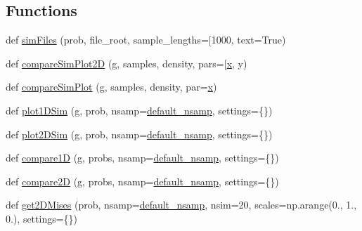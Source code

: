 \subsection*{Functions}
\begin{DoxyCompactItemize}
\item 
def \mbox{\hyperlink{namespacegetdist__tests_1_1test__distributions_a67a512c46fba1d2a8de61258145201a8}{sim\+Files}} (prob, file\+\_\+root, sample\+\_\+lengths=\mbox{[}1000, text=True)
\item 
def \mbox{\hyperlink{namespacegetdist__tests_1_1test__distributions_ae808a89af18399d4abd592da4c182444}{compare\+Sim\+Plot2D}} (g, samples, density, pars=\mbox{[}\textquotesingle{}\mbox{\hyperlink{plotTT_8m_a9336ebf25087d91c818ee6e9ec29f8c1}{x}}\textquotesingle{}, y)
\item 
def \mbox{\hyperlink{namespacegetdist__tests_1_1test__distributions_a52f500d4237fe1a9b8698c71102c025d}{compare\+Sim\+Plot}} (g, samples, density, par=\textquotesingle{}\mbox{\hyperlink{plotTT_8m_a9336ebf25087d91c818ee6e9ec29f8c1}{x}}\textquotesingle{})
\item 
def \mbox{\hyperlink{namespacegetdist__tests_1_1test__distributions_a3ae94f720e6178acca116decb0f76a8f}{plot1\+D\+Sim}} (g, prob, nsamp=\mbox{\hyperlink{namespacegetdist__tests_1_1test__distributions_af66b4064706bf88e0ed5378ff868fc39}{default\+\_\+nsamp}}, settings=\{\})
\item 
def \mbox{\hyperlink{namespacegetdist__tests_1_1test__distributions_aef08c01dc3b9daf15ea7f11c2927610e}{plot2\+D\+Sim}} (g, prob, nsamp=\mbox{\hyperlink{namespacegetdist__tests_1_1test__distributions_af66b4064706bf88e0ed5378ff868fc39}{default\+\_\+nsamp}}, settings=\{\})
\item 
def \mbox{\hyperlink{namespacegetdist__tests_1_1test__distributions_a58a3396fc92c2a94495d2f7f5a7afbb7}{compare1D}} (g, probs, nsamp=\mbox{\hyperlink{namespacegetdist__tests_1_1test__distributions_af66b4064706bf88e0ed5378ff868fc39}{default\+\_\+nsamp}}, settings=\{\})
\item 
def \mbox{\hyperlink{namespacegetdist__tests_1_1test__distributions_a26f4c8bf142c2c7fe7c5b0369c093bd1}{compare2D}} (g, probs, nsamp=\mbox{\hyperlink{namespacegetdist__tests_1_1test__distributions_af66b4064706bf88e0ed5378ff868fc39}{default\+\_\+nsamp}}, settings=\{\})
\item 
def \mbox{\hyperlink{namespacegetdist__tests_1_1test__distributions_a33e553d1690409e6be303cd912648ec5}{get2\+D\+Mises}} (prob, nsamp=\mbox{\hyperlink{namespacegetdist__tests_1_1test__distributions_af66b4064706bf88e0ed5378ff868fc39}{default\+\_\+nsamp}}, nsim=20, scales=np.\+arange(0., 1., 0.), settings=\{\})

\end{DoxyCompactItemize}
